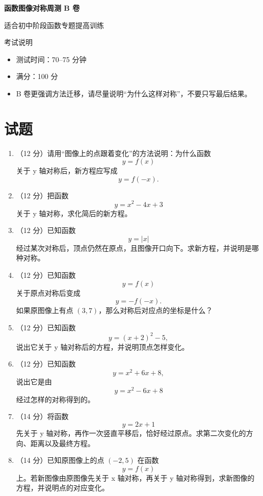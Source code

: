 \documentclass[11pt,a4paper,fontset=fandol]{ctexart}
\newcommand{\answerspace}{\vspace{2.3cm}}
\newcommand{\biganswerspace}{\vspace{3.2cm}}
\begin{document}
\thispagestyle{empty}
\begin{center}
{\fontsize{22}{28}\selectfont\bfseries 函数图像对称周测 B 卷\par}
\vspace{0.4cm}
{\large 适合初中阶段函数专题提高训练\par}
\end{center}

\begin{infobox}{考试说明}
\begin{itemize}
  \item 测试时间：70--75 分钟
  \item 满分：100 分
  \item B 卷更强调方法迁移，请尽量说明“为什么这样对称”，不要只写最后结果。
\end{itemize}
\end{infobox}

\section{试题}

\begin{enumerate}
  \item （12 分）请用“图像上的点跟着变化”的方法说明：为什么函数
  \[
  y=f(x)
  \]
  关于 y 轴对称后，新方程应写成
  \[
  y=f(-x).
  \]
  \biganswerspace

  \item （12 分）把函数
  \[
  y=x^2-4x+3
  \]
  关于 y 轴对称，求化简后的新方程。
  \answerspace

  \item （12 分）已知函数
  \[
  y=|x|
  \]
  经过某次对称后，顶点仍然在原点，且图像开口向下。求新方程，并说明是哪种对称。
  \answerspace

  \item （12 分）已知函数
  \[
  y=f(x)
  \]
  关于原点对称后变成
  \[
  y=-f(-x).
  \]
  如果原图像上有点 $(3,7)$，那么对称后对应点的坐标是什么？
  \answerspace

  \item （12 分）已知函数
  \[
  y=(x+2)^2-5,
  \]
  说出它关于 y 轴对称后的方程，并说明顶点怎样变化。
  \answerspace

  \item （12 分）已知函数
  \[
  y=x^2+6x+8,
  \]
  说出它是由
  \[
  y=x^2-6x+8
  \]
  经过怎样的对称得到的。
  \answerspace

  \item （14 分）将函数
  \[
  y=2x+1
  \]
  先关于 y 轴对称，再作一次竖直平移后，恰好经过原点。求第二次变化的方向、距离以及最终方程。
  \biganswerspace

  \item （14 分）已知原图像上的点 $(-2,5)$ 在函数
  \[
  y=f(x)
  \]
  上。若新图像由原图像先关于 x 轴对称，再关于 y 轴对称得到，求新图像的方程，并说明点的对应变化。
  \biganswerspace
\end{enumerate}
\end{document}
